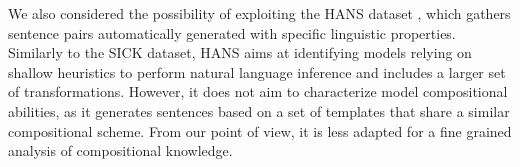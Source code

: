 We also considered the possibility of exploiting the HANS dataset \parencite{mccoy_19}, which gathers  sentence pairs automatically generated with specific linguistic properties. Similarly to the SICK dataset, HANS aims at identifying models relying on shallow heuristics to perform natural language inference and includes a larger set of transformations. However, it does not aim to characterize model compositional abilities, as it generates sentences based on a set of templates that share a similar compositional scheme. From our point of view, it is less adapted for a fine grained analysis of compositional knowledge.





